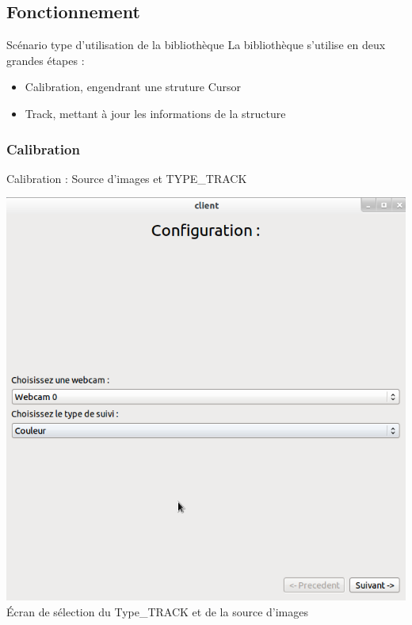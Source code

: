 \documentclass{beamer}
\begin{document}
            \subsection{Fonctionnement}
            \begin{frame}{Scénario type d'utilisation de la bibliothèque}
                  La bibliothèque s'utilise en deux grandes étapes :
                  \begin{itemize}
                        \item{Calibration, engendrant une struture Cursor}
                        \item{Track, mettant à jour les informations de la structure}
                  \end{itemize}
            \end{frame}

            \subsubsection{Calibration}
            \begin{frame}{Calibration : Source d'images et TYPE\_TRACK}
                  \begin{center}
                        \includegraphics[scale=0.25]{Capture6.png}\\
                        Écran de sélection du Type\_TRACK et de la source d'images
                  \end{center}
            \end{frame}
\end{document}
